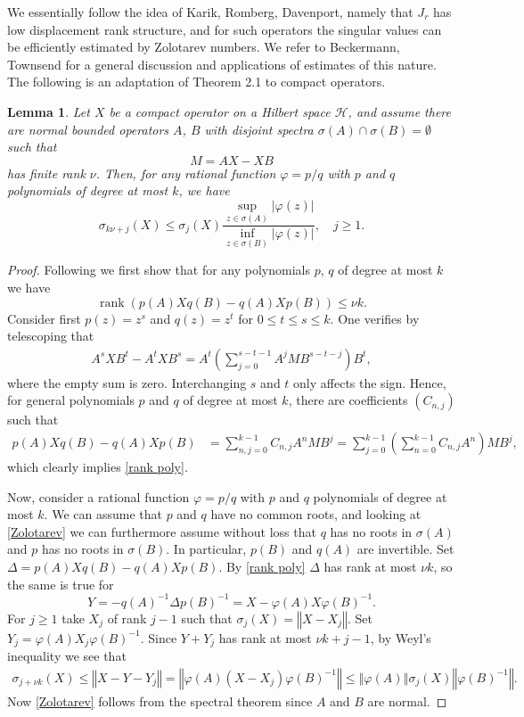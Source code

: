 \documentclass[12pt]{amsart}
\numberwithin{equation}{section}
\newcommand{\abs}[1]{| #1 |}
\newcommand{\norm}[1]{\left\Vert #1 \right\Vert}
\renewcommand{\phi}{\varphi}
\newtheorem{lemma}[Thm]{Lemma}
\begin{document}
\iffalse 
We essentially follow the idea of Karik, Romberg, Davenport, namely that $J_r$ has low displacement rank structure, and for such operators the singular values can be efficiently estimated by Zolotarev numbers. We refer to Beckermann, Townsend for a general discussion and applications of estimates of this nature. The following is an adaptation of Theorem 2.1 to compact operators.
\begin{lemma}\label{Zolotarev Lemma}
Let $X$ be a compact operator on a Hilbert space $\mathcal{H}$, and assume there are normal bounded operators $A$, $B$ with disjoint spectra $\sigma(A) \cap \sigma(B) = \emptyset$ such that
\[
M = AX - XB
\]
has finite rank $\nu$. Then, for any rational function $\phi = p/q$ with $p$ and $q$ polynomials of degree at most $k$, we have 
\begin{equation}\label{Zolotarev}
\sigma_{k\nu + j }(X) \leq \sigma_j(X) \frac{\sup_{z\in \sigma(A)}\abs{\phi(z)}}{\inf_{z\in \sigma(B)} \abs{\phi(z)}}, \quad j\geq 1.
\end{equation}
\end{lemma}
\begin{proof}
Following \cite{} we first show that for any polynomials $p$, $q$ of degree at most $k$ we have
\begin{equation}\label{rank poly}
\operatorname{rank}(p(A)X q(B) - q(A)X p(B)) \leq \nu k.
\end{equation}
Consider first $p(z) = z^s$ and $q(z) = z^t$ for $0\leq t \leq s \leq k$. One verifies by telescoping that 
\begin{align*}
A^s X B^t - A^t X B^s  = A^t \left(\sum_{j=0}^{s-t-1} A^j M B^{s-t-j}  \right) B^t,  
\end{align*}
where the empty sum is zero. Interchanging $s$ and $t$ only affects the sign. Hence, for general polynomials $p$ and $q$ of degree at most $k$, there are coefficients $(C_{n,j})$ such that
\begin{align*}
p(A)X q(B) - q(A)X p(B) &= \sum_{n,j=0}^{k-1} C_{n,j} A^n M B^j = \sum_{j=0}^{k-1} \left(\sum_{n=0}^{k-1} C_{n,j} A^n\right) M B^j,
\end{align*}
which clearly implies \eqref{rank poly}.

Now, consider a rational function $\phi = p/q$ with $p$ and $q$ polynomials of degree at most $k$. We can assume that $p$ and $q$ have no common roots, and looking at \eqref{Zolotarev} we can furthermore assume without loss that $q$ has no roots in $\sigma(A)$ and $p$ has no roots in $\sigma(B)$. In particular, $p(B)$ and $q(A)$ are invertible. Set $\Delta = p(A) X q(B) - q(A) X p(B)$. By \eqref{rank poly} $\Delta$ has rank at most $\nu k$, so the same is true for 
\[
Y = - q(A)^{-1} \Delta p(B)^{-1} = X - \phi(A) X \phi(B)^{-1}.
\]
For $j\geq 1$ take $X_j$ of rank $j-1$ such that $\sigma_j(X) = \norm{X-X_j}$. Set $Y_j = \phi(A) X_j \phi(B)^{-1}$. Since $Y + Y_j$ has rank at most $\nu k + j-1$, by Weyl's inequality we see that 
\begin{align*}
\sigma_{j + \nu k} (X) \leq \norm{X - Y - Y_j}  = \norm{\phi(A)(X-X_j) \phi(B)^{-1}} \leq \norm{\phi(A)} \sigma_j(X) \norm{\phi(B)^{-1}}.
\end{align*}
Now \eqref{Zolotarev} follows from the spectral theorem since $A$ and $B$ are normal. 
\end{proof}
\end{document}
